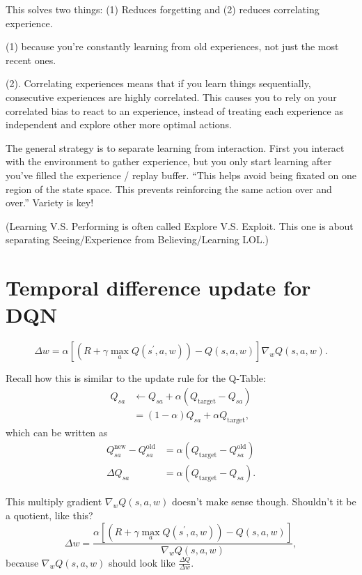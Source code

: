 \documentclass[20pt]{extarticle}
\theoremstyle{plain}
\theoremstyle{definition}
\theoremstyle{remark}
\newcommand{\0}{\varnothing}
\newcommand{\<}{\langle}
\renewcommand{\>}{\rangle}
\begin{document}
This solves two things: (1) Reduces forgetting and (2) reduces correlating experience.

(1) because you're constantly learning from old experiences, not just the most recent ones.

(2). Correlating experiences means that if you learn things sequentially,
consecutive experiences are highly correlated. This causes you to rely on your
correlated bias to react to an experience, instead of treating each experience
as independent and explore other more optimal actions.

The general strategy is to separate learning from interaction. First you interact with the environment to gather experience, but you only start learning after you've filled the experience / replay buffer. ``This helps avoid being fixated on one region of the state space. This prevents reinforcing the same action over and over.'' Variety is key!

(Learning V.S. Performing is often called Explore V.S. Exploit. This one is about separating Seeing/Experience from Believing/Learning LOL.)

\section{Temporal difference update for DQN}

$$
\Delta w = \alpha \left[ \left( R + \gamma \max _ { a } Q \left( s ^ { \prime } , a , w \right) \right) - Q ( s , a , w ) \right] \nabla _ { w } Q ( s , a , w ).
$$

Recall how this is similar to the update rule for the Q-Table:
\begin{align*}
Q_{sa} &\gets Q_{sa} + \alpha (Q_{\text{target}} - Q_{sa}) \\
&= (1 - \alpha) Q_{sa} + \alpha Q_{\text{target}},
\end{align*}
which can be written as
\begin{align*}
Q^{\text{new}}_{sa} - Q^{\text{old}}_{sa} &= \alpha (Q_{\text{target}} - Q^{\text{old}}_{sa}) \\
\Delta Q_{sa} &= \alpha (Q_{\text{target}} - Q_{sa}).
\end{align*}

This multiply gradient $ \nabla _ { w } Q ( s , a , w ) $ doesn't make sense though. Shouldn't it be a quotient, like this?
$$
\Delta w = \frac{\alpha \left[ \left( R + \gamma \max _ { a } Q \left( s ^ { \prime } , a , w \right) \right) - Q ( s , a , w ) \right]}{\nabla _ { w } Q ( s , a , w )},
$$
because $ \nabla _ { w } Q ( s , a , w ) $ should look like $ \frac{\Delta Q }{\Delta w}. $
\end{document}

